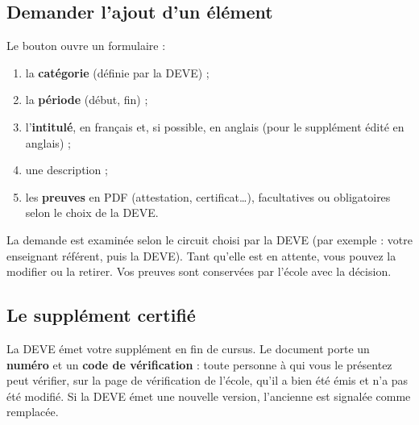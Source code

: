\documentclass[11pt,a4paper]{article}
\begin{document}

\subsection{Demander l'ajout d'un élément}

Le bouton  ouvre un formulaire :
\begin{enumerate}
  \item la \textbf{catégorie} (définie par la DEVE) ;
  \item la \textbf{période} (début, fin) ;
  \item l'\textbf{intitulé}, en français et, si possible, en anglais (pour le supplément édité
    en anglais) ;
  \item une description ;
  \item les \textbf{preuves} en PDF (attestation, certificat\dots), facultatives ou obligatoires
    selon le choix de la DEVE.
\end{enumerate}


La demande est examinée selon le circuit choisi par la DEVE (par exemple : votre enseignant
référent, puis la DEVE). Tant qu'elle est en attente, vous pouvez la modifier ou la retirer.
Vos preuves sont conservées par l'école avec la décision.

\subsection{Le supplément certifié}

La DEVE émet votre supplément en fin de cursus. Le document porte un \textbf{numéro} et un
\textbf{code de vérification} : toute personne à qui vous le présentez peut vérifier, sur la
page de vérification de l'école, qu'il a bien été émis et n'a pas été modifié. Si la DEVE émet
une nouvelle version, l'ancienne est signalée comme remplacée.
\end{document}
